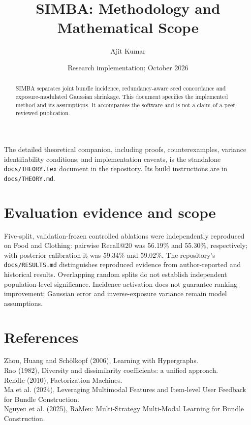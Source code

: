 \documentclass[11pt]{article}
\title{SIMBA: Methodology and Mathematical Scope}
\author{Ajit Kumar}
\date{Research implementation; October 2026}
\begin{document}
\maketitle
\begin{abstract}
SIMBA separates joint bundle incidence, redundancy-aware seed concordance and
exposure-modulated Gaussian shrinkage. This document specifies the implemented
method and its assumptions. It accompanies the software and is not a claim of
a peer-reviewed publication.
\end{abstract}
The detailed theoretical companion, including proofs, counterexamples, variance
identifiability conditions, and implementation caveats, is the standalone
\texttt{docs/THEORY.tex} document in the repository. Its build instructions are
in \texttt{docs/THEORY.md}.

\section{Evaluation evidence and scope}\label{sec:results}
Five-split, validation-frozen controlled ablations were independently reproduced
on Food and Clothing: pairwise Recall@20 was 56.19\% and 55.30\%, respectively;
with posterior calibration it was 59.34\% and 59.02\%. The repository's
\texttt{docs/RESULTS.md} distinguishes reproduced evidence from author-reported
and historical results. Overlapping random splits do not establish independent
population-level significance. Incidence activation does not guarantee ranking
improvement; Gaussian error and inverse-exposure variance remain model assumptions.
\section*{References}
Zhou, Huang and Sch\"olkopf (2006), Learning with Hypergraphs.\\
Rao (1982), Diversity and dissimilarity coefficients: a unified approach.\\
Rendle (2010), Factorization Machines.\\
Ma et al. (2024), Leveraging Multimodal Features and Item-level User Feedback
for Bundle Construction.\\
Nguyen et al. (2025), RaMen: Multi-Strategy Multi-Modal Learning for Bundle Construction.
\end{document}
